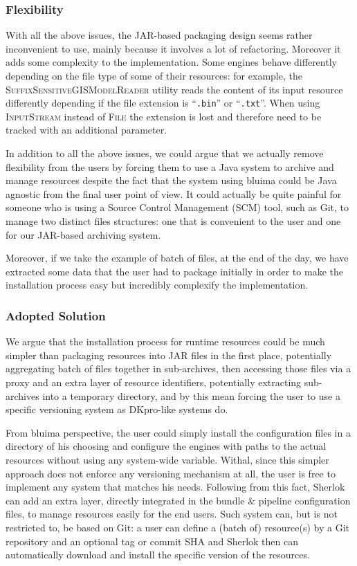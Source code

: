 \documentclass{article}
\newcommand{\ID}[1]{{\textsc{#1}}}
\newcommand{\PATH}[1]{\mbox{\texttt{#1}}}
\newcommand{\JAR}{JAR\xspace}
\begin{document}
\subsubsection{Flexibility}

With all the above issues, the \JAR-based packaging design seems rather inconvenient to use, mainly
because it involves a lot of refactoring. Moreover it adds some complexity to the implementation.
Some engines behave differently depending on the file type of some of their resources: for example,
the \ID{SuffixSensitiveGISModelReader} utility reads the content of its input resource differently
depending if the file extension is ``\PATH{.bin}'' or ``\PATH{.txt}''. When using \ID{InputStream}
instead of \ID{File} the extension is lost and therefore need to be tracked with an additional
parameter.

In addition to all the above issues, we could argue that we actually remove flexibility from the
users by forcing them to use a Java system to archive and manage resources despite the fact that the
system using bluima could be Java agnostic from the final user point of view. It could actually be
quite painful for someone who is using a Source Control Management (SCM) tool, such as Git, to
manage two distinct files structures: one that is convenient to the user and one for our \JAR-based
archiving system.

Moreover, if we take the example of batch of files, at the end of the day, we have extracted some
data that the user had to package initially in order to make the installation process easy but
incredibly complexify the implementation.


\subsubsection{Adopted Solution}

We argue that the installation process for runtime resources could be much simpler than packaging
resources into \JAR files in the first place, potentially aggregating batch of files together in
sub-archives, then accessing those files via a proxy and an extra layer of resource identifiers,
potentially extracting sub-archives into a temporary directory, and by this mean forcing the user to
use a specific versioning system as DKpro-like systems do.

From bluima perspective, the user could simply install the configuration files in a directory of his
choosing and configure the engines with paths to the actual resources without using any system-wide
variable. Withal, since this simpler approach does not enforce any versioning mechanism at all, the
user is free to implement any system that matches his needs. Following from this fact, Sherlok can
add an extra layer, directly integrated in the bundle \& pipeline configuration files, to manage
resources easily for the end users. Such system can, but is not restricted to, be based on Git: a
user can define a (batch of) resource(s) by a Git repository and an optional tag or commit SHA and
Sherlok then can automatically download and install the specific version of the resources.
\end{document}
